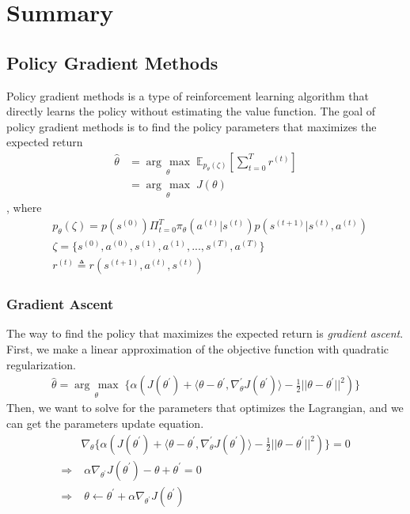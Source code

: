 \documentclass[11pt]{article}
\newcommand{\argmax}[1]{\underset{#1}{\operatorname{arg}\,\operatorname{max}}\;}
\begin{document}
\section{Summary}
\subsection{Policy Gradient Methods}
Policy gradient methods is a type of reinforcement learning algorithm that directly learns the policy without estimating the value function. The goal of policy gradient methods is to find the policy parameters that maximizes the expected return
\begin{align*}
    \hat{\theta} & = \argmax{\theta} \mathbb{E}_{p_\theta(\zeta)}\left[\sum_{t=0}^Tr^{(t)}\right] \\
    & = \argmax{\theta} J(\theta)
\end{align*},
where 
\begin{align*}
    & p_\theta(\zeta) = p(s^{(0)})\Pi_{t=0}^T\pi_\theta(a^{(t)}|s^{(t)})p(s^{(t+1)}|s^{(t)}, a^{(t)}) \\
    & \zeta  = \{s^{(0)}, a^{(0)}, s^{(1)}, a^{(1)}, ..., s^{(T)}, a^{(T)}\} \\
    & r^{(t)} \triangleq r(s^{(t+1)}, a^{(t)}, s^{(t)})
\end{align*}

\subsubsection{Gradient Ascent}

The way to find the policy that maximizes the expected return is \emph{gradient ascent}. First, we make a linear approximation of the objective function with quadratic regularization.
\begin{align*}
    \hat{\theta} = \argmax{\theta}\{\alpha(J(\theta^{'})+\langle\theta-\theta^{'}, \nabla_\theta^{'}J(\theta^{'})\rangle - \frac{1}{2}||\theta-\theta^{'}||^2)\}
\end{align*}
Then, we want to solve for the parameters that optimizes the Lagrangian, and we can get the parameters update equation.
\begin{align*}
    & \nabla_\theta\{\alpha(J(\theta^{'})+\langle\theta-\theta^{'}, \nabla_\theta^{'}J(\theta^{'})\rangle - \frac{1}{2}||\theta-\theta^{'}||^2)\} = 0 \\
    \Rightarrow & \;\alpha\nabla_{\theta^{'}}J(\theta^{'}) - \theta + \theta^{'} = 0 \\
    \Rightarrow & \;\theta \leftarrow \theta^{'} + \alpha \nabla_{\theta^{'}}J(\theta^{'})
\end{align*}
\end{document}
